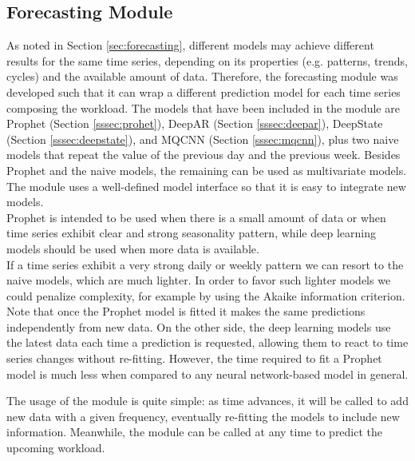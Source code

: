 \documentclass[a4paper, 12pt]{article} %
\begin{document}
	\subsection{Forecasting Module} \label{ssec:forecasting_module}
	As noted in Section \ref{sec:forecasting}, different models may achieve different results for the same time series, depending on its properties (e.g. patterns, trends, cycles) and the available amount of data. Therefore, the forecasting module was developed such that it can wrap a different prediction model for each time series composing the workload.
	The models that have been included in the module are Prophet (Section \ref{sssec:prohet}), DeepAR (Section \ref{sssec:deepar}), DeepState (Section \ref{sssec:deepstate}), and MQCNN (Section \ref{sssec:mqcnn}), plus two naive models that repeat the value of the previous day and the previous week. Besides Prophet and the naive models, the remaining can be used as multivariate models. The module uses a well-defined model interface so that it is easy to integrate new models.\\
	Prophet is intended to be used when there is a small amount of data or when time series exhibit clear and strong seasonality pattern, while deep learning models should be used when more data is available.\\
	If a time series exhibit a very strong daily or weekly pattern we can resort to the naive models, which are much lighter. In order to favor such lighter models we could penalize complexity, for example by using the Akaike information criterion. \\
	Note that once the Prophet model is fitted it makes the same predictions independently from new data. On the other side, the deep learning models use the latest data each time a prediction is requested, allowing them to react to time series changes without re-fitting. However, the time required to fit a Prophet model is much less when compared to any neural network-based model in general.
	
	The usage of the module is quite simple: as time advances, it will be called to add new data with a given frequency, eventually re-fitting the models to include new information. Meanwhile, the module can be called at any time to predict the upcoming workload. 
	
\end{document}
